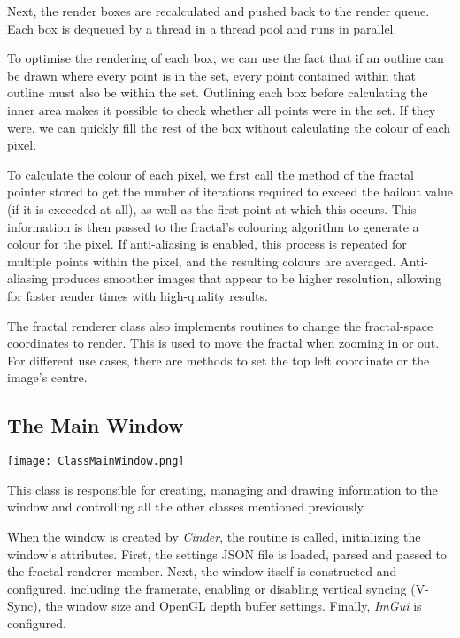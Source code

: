 Next, the render boxes are recalculated and pushed back to the render queue. Each box is dequeued by a thread in a thread pool and runs in parallel.

To optimise the rendering of each box, we can use the fact that if an outline can be drawn where every point is in the set, every point contained within that outline must also be within the set. Outlining each box before calculating the inner area makes it possible to check whether all points were in the set. If they were, we can quickly fill the rest of the box without calculating the colour of each pixel.

To calculate the colour of each pixel, we first call the  method of the fractal pointer stored to get the number of iterations required to exceed the bailout value (if it is exceeded at all), as well as the first point at which this occurs. This information is then passed to the fractal's colouring algorithm to generate a colour for the pixel. If anti-aliasing is enabled, this process is repeated for multiple points within the pixel, and the resulting colours are averaged. Anti-aliasing produces smoother images that appear to be higher resolution, allowing for faster render times with high-quality results.

The fractal renderer class also implements routines to change the fractal-space coordinates to render. This is used to move the fractal when zooming in or out. For different use cases, there are methods to set the top left coordinate or the image's centre.

\subsection{The Main Window}

\FloatBarrier
\begin{figure*}[htp]
    \centering
    \texttt{[image: ClassMainWindow.png]}
\end{figure*}
\FloatBarrier

This class is responsible for creating, managing and drawing information to the window and controlling all the other classes mentioned previously.

\vspace{0.5cm}
\noindent
When the window is created by \textit{Cinder}, the  routine is called, initializing the window's attributes. First, the settings JSON file is loaded, parsed and passed to the fractal renderer member. Next, the window itself is constructed and configured, including the framerate, enabling or disabling vertical syncing (V-Sync), the window size and OpenGL depth buffer settings. Finally, \textit{ImGui} is configured.

